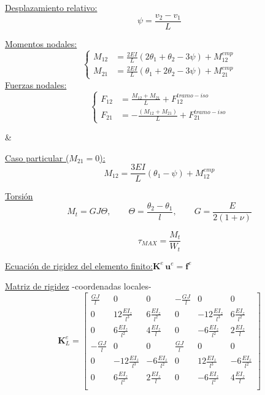 \underline{Desplazamiento relativo:}
$$\psi=\frac{v_2 - v_1}{L}$$

\underline{Momentos nodales:}
$$
\left\{
\begin{array}{rl}
\displaystyle
M_{12} &=\frac{2 EI}{L} \left( 2 \theta_1  + \theta_2 - 3 \psi   \right)  +  M_{12}^{emp}  \\[3mm]
\displaystyle
M_{21} &=\frac{2 EI}{L} \left( \theta_1 + 2  \theta_2 - 3 \psi  \right)   +  M_{21}^{emp}
\end{array}
\right.
$$
\vspace{0.2cm}
\underline{Fuerzas nodales:}
$$
\left\{
\begin{array}{rl}
\displaystyle
F_{12} &= \frac{M_{12} + M_{21}}{L} + F_{12}^{tramo-iso} \\[3mm]
\displaystyle
F_{21} &= -\frac{(M_{12} + M_{21})}{L} + F_{21}^{tramo-iso} 
\end{array}
\right.
$$

&

\underline{Caso particular ($M_{21}=0$):}
$$
M_{12}=\frac{3EI}{L}\left( \theta_{1}-\psi \right) + M_{12}^{emp}
$$

\begin{center}
\end{center}

\underline{Torsión}
$$
M_t=GJ\Theta,
\qquad
\Theta=\frac{\theta_2 - \theta_1}{l},
\qquad
G=\frac{E}{2(1+\nu)}
$$


$$
\tau_{MAX}=\frac{M_t}{W_t}
$$


\vspace{0.2cm}
\begin{center}
	\def\svgwidth{0.65\textwidth}
	
\end{center}


\vspace{0.3cm}
\underline{Ecuación de rigidez del elemento finito:}\quad $ \textbf{K}^e \, \textbf{u}^e=\textbf{f}^e$

\vspace{0.3cm}
\underline{Matriz de rigidez} -coordenadas locales-
\renewcommand{\arraystretch}{1.35}
\[
\textbf{K}_L^e = 
\left[
\begin{matrix}
\frac{GJ}{l}  & 0 & 0 & -\frac{GJ}{l} & 0 & 0 \\
0  & 12\frac{EI_z}{l^3} & 6\frac{EI_z}{l^2} & 0  & -12\frac{EI_z}{l^3} & 6\frac{EI_z}{l^2} \\
0  & 6\frac{EI_z}{l^2} & 4\frac{EI_z}{l} & 0  & -6\frac{EI_z}{l^2} & 2\frac{EI_z}{l} \\
-\frac{GJ}{l}  & 0 & 0 & \frac{GJ}{l} & 0 & 0 \\
0  & -12\frac{EI_z}{l^3} & -6\frac{EI_z}{l^2} & 0  & 12\frac{EI_z}{l^3} & -6\frac{EI_z}{l^2} \\
0  & 6\frac{EI_z}{l^2} & 2\frac{EI_z}{l} & 0  & -6\frac{EI_z}{l^2} & 4\frac{EI_z}{l} \\
\end{matrix}
\right]
\]

